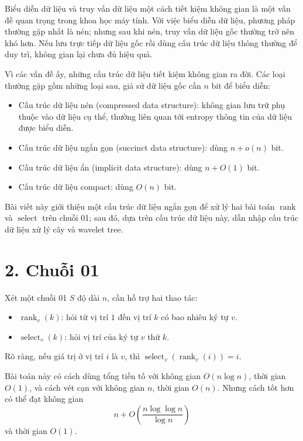\documentclass[11pt]{article}
\DeclareMathOperator{\rank}{rank}
\begin{document}
Biểu diễn dữ liệu và truy vấn dữ liệu một cách tiết kiệm không gian là một vấn
đề quan trọng trong khoa học máy tính. Với việc biểu diễn dữ liệu, phương pháp
thường gặp nhất là nén; nhưng sau khi nén, truy vấn dữ liệu gốc thường trở nên
khó hơn. Nếu lưu trực tiếp dữ liệu gốc rồi dùng cấu trúc dữ liệu thông thường
để duy trì, không gian lại chưa đủ hiệu quả.

Vì các vấn đề ấy, những cấu trúc dữ liệu tiết kiệm không gian ra đời. Các loại
thường gặp gồm những loại sau, giả sử dữ liệu gốc cần \(n\) bit để biểu diễn:

\begin{itemize}
  \item Cấu trúc dữ liệu nén (compressed data structure): không gian lưu trữ
        phụ thuộc vào dữ liệu cụ thể, thường liên quan tới entropy thông tin
        của dữ liệu được biểu diễn.
  \item Cấu trúc dữ liệu ngắn gọn (succinct data structure): dùng
        \(n+o(n)\) bit.
  \item Cấu trúc dữ liệu ẩn (implicit data structure): dùng \(n+O(1)\) bit.
  \item Cấu trúc dữ liệu compact: dùng \(O(n)\) bit.
\end{itemize}

Bài viết này giới thiệu một cấu trúc dữ liệu ngắn gọn để xử lý hai bài toán
\(\rank\) và \(\operatorname{select}\) trên chuỗi 01; sau đó, dựa trên cấu trúc
dữ liệu này, dẫn nhập cấu trúc dữ liệu xử lý cây và wavelet tree.

\section*{2. Chuỗi 01}

Xét một chuỗi 01 \(S\) độ dài \(n\), cần hỗ trợ hai thao tác:

\begin{itemize}
  \item \(\rank_v(k)\): hỏi từ vị trí \(1\) đến vị trí \(k\) có bao nhiêu ký
        tự \(v\).
  \item \(\operatorname{select}_v(k)\): hỏi vị trí của ký tự \(v\) thứ \(k\).
\end{itemize}

Rõ ràng, nếu giá trị ở vị trí \(i\) là \(v\), thì
\(\operatorname{select}_v(\rank_v(i))=i\).

Bài toán này có cách dùng tổng tiền tố với không gian \(O(n\log n)\), thời
gian \(O(1)\), và cách vét cạn với không gian \(n\), thời gian \(O(n)\). Nhưng
cách tốt hơn có thể đạt không gian
\[
  n+O\left(\frac{n\log\log n}{\log n}\right)
\]
và thời gian \(O(1)\).
\end{document}
